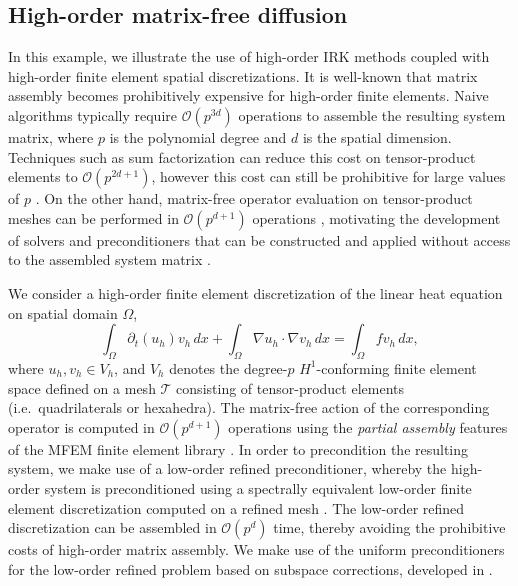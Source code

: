 \documentclass[review]{siamart}
\begin{document}
\subsection{High-order matrix-free diffusion}

In this example, we illustrate the use of high-order IRK methods coupled with high-order finite element spatial discretizations.
It is well-known that matrix assembly becomes prohibitively expensive for high-order finite elements.
Naive algorithms typically require $\mathcal{O}(p^{3d})$ operations to assemble the resulting system matrix, where $p$ is the polynomial degree and $d$ is the spatial dimension.
Techniques such as sum factorization can reduce this cost on tensor-product elements to $\mathcal{O}(p^{2d+1})$, however this cost can still be prohibitive for large values of $p$ \cite{Melenk2001}.
On the other hand, matrix-free operator evaluation on tensor-product meshes can be performed in $\mathcal{O}(p^{d+1})$ operations \cite{Orszag1980}, motivating the development of solvers and preconditioners that can be constructed and applied without access to the assembled system matrix \cite{Kronbichler2019}.

We consider a high-order finite element discretization of the linear heat equation on spatial domain $\Omega$,
\[
	\int_\Omega \partial_t (u_h) v_h \, dx + \int_\Omega \nabla u_h \cdot \nabla v_h \, dx = \int_\Omega f v_h \, dx,
\]
where $u_h, v_h \in V_h$, and $V_h$ denotes the degree-$p$ $H^1$-conforming finite element space defined on a mesh $\mathcal{T}$ consisting of tensor-product elements (i.e.\ quadrilaterals or hexahedra).
The matrix-free action of the corresponding operator is computed in $\mathcal{O}(p^{d+1})$ operations using the \textit{partial assembly} features of the MFEM finite element library \cite{Anderson2020}.
In order to precondition the resulting system, we make use of a low-order refined preconditioner, whereby the high-order system is preconditioned using a spectrally equivalent low-order finite element discretization computed on a refined mesh \cite{Canuto2010}.
The low-order refined discretization can be assembled in $\mathcal{O}(p^d)$ time, thereby avoiding the prohibitive costs of high-order matrix assembly.
We make use of the uniform preconditioners for the low-order refined problem based on subspace corrections, developed in \cite{Pazner2019a}.
\end{document}
